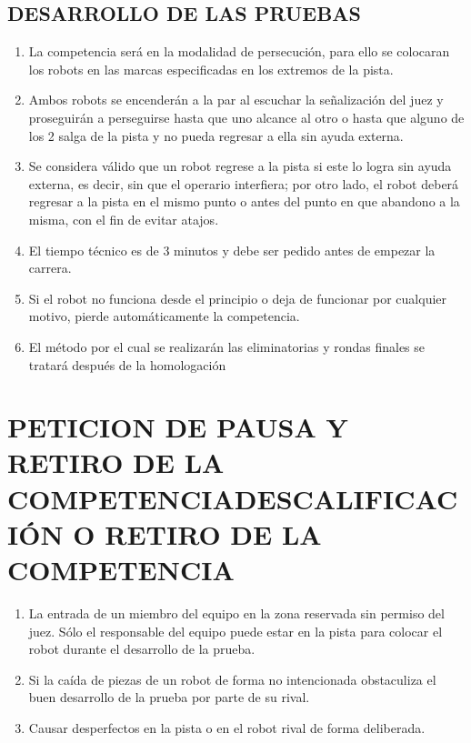 \documentclass{article}
\begin{document}
 \subsection{DESARROLLO DE LAS PRUEBAS}
 
 
 \begin{enumerate}
\item La competencia será en la modalidad de persecución, para ello se colocaran
los robots en las marcas especificadas en los extremos de la pista.
\item Ambos robots se encenderán a la par al escuchar la señalización del juez y
proseguirán a perseguirse hasta que uno alcance al otro o hasta que alguno
de los 2 salga de la pista y no pueda regresar a ella sin ayuda externa.
\item Se considera válido que un robot regrese a la pista si este lo logra sin ayuda
externa, es decir, sin que el operario interfiera; por otro lado, el robot deberá
regresar a la pista en el mismo punto o antes del punto en que abandono a la
misma, con el fin de evitar atajos.
\item El tiempo técnico es de 3 minutos y debe ser pedido antes de empezar la
carrera.
\item Si el robot no funciona desde el principio o deja de funcionar
por cualquier motivo, pierde automáticamente la competencia.
\item El método por el cual se realizarán las eliminatorias y rondas finales se tratará
después de la homologación
\end{enumerate}


\section{PETICION DE PAUSA Y RETIRO DE LA COMPETENCIADESCALIFICACIÓN O RETIRO DE LA COMPETENCIA}

\begin{enumerate}
\item La entrada de un miembro del equipo en la zona reservada sin
permiso del juez. Sólo el responsable del equipo puede estar en la
pista para colocar el robot durante el desarrollo de la prueba.
\item Si la caída de piezas de un robot de forma no intencionada
obstaculiza el buen desarrollo de la prueba por parte de su rival.
\item Causar desperfectos en la pista o en el robot rival de forma deliberada.
\end{enumerate}
\end{document}

